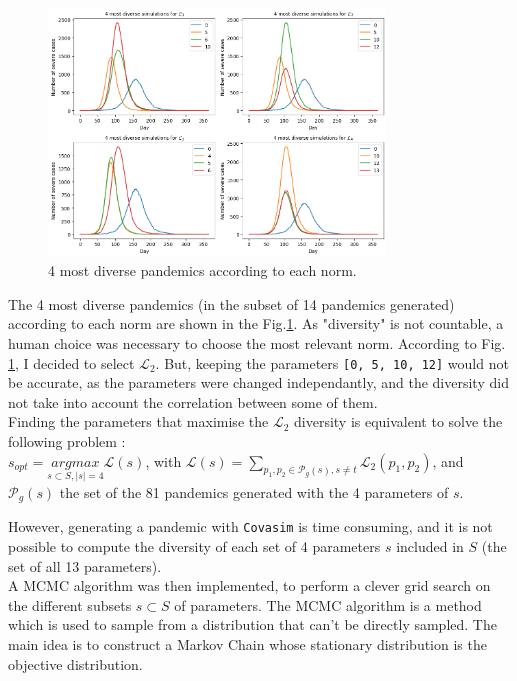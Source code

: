 \begin{figure}
    \centering
    \includegraphics[width=0.8\textwidth]{figures/most_different_pandemics.png}
    \caption{4 most diverse pandemics according to each norm.}
    \label{fig:diversity_pandemics}
\end{figure}


The 4 most diverse pandemics (in the subset of 14 pandemics generated) according to each norm are shown in the Fig.\ref{fig:diversity_pandemics}.
As "diversity" is not countable, a human choice was necessary to choose the most relevant norm.
According to Fig. \ref{fig:diversity_pandemics}, I decided to select $\mathcal{L}_2$.
But, keeping the parameters \texttt{[0, 5, 10, 12]} would not be accurate, as the parameters were changed independantly, and the diversity did not take into account the correlation between some of them. \\

Finding the parameters that maximise the $\mathcal{L}_2$ diversity is equivalent to solve the following problem : \\

$ s_{opt} = \underset{s \subset S , \vert s \vert =4 }{argmax  } \mathcal{ L}(s)$, with $ \mathcal{L}(s)= \sum_{p_1, p_2 \in \mathcal{P}_g(s) , s \neq t }{\mathcal{L}_2(p_1,p_2)}$, and  $\mathcal{P}_{g}(s)$ the set of the 81 pandemics generated with the 4 parameters of $s$.

However, generating a pandemic with \texttt{Covasim} is time consuming, and it is not possible to compute the diversity of each set of 4 parameters $s$ included in $S$ (the set of all 13 parameters).\\[1cm]


A MCMC algorithm \cite*{diaconis2009markov} was then implemented, to perform a clever grid search on the different subsets $s \subset S $ of parameters.
The MCMC algorithm is a method which is used to sample from a distribution that can't be directly sampled. 
The main idea is to construct a Markov Chain whose stationary distribution is the objective distribution.

